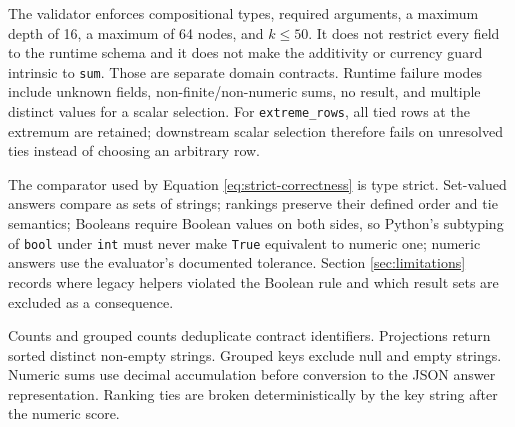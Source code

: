 The validator enforces compositional types, required arguments, a maximum depth of 16, a maximum
of 64 nodes, and $k\leq50$.  It does not restrict every field to the runtime schema and it does
not make the additivity or currency guard intrinsic to \texttt{sum}.  Those are separate domain
contracts.  Runtime failure modes include unknown fields, non-finite/non-numeric sums, no result,
and multiple distinct values for a scalar selection.  For \texttt{extreme\_rows}, all tied rows
at the extremum are retained; downstream scalar selection therefore fails on unresolved ties
instead of choosing an arbitrary row.

The comparator used by Equation \ref{eq:strict-correctness} is type strict.  Set-valued answers
compare as sets of strings; rankings preserve their defined order and tie semantics; Booleans
require Boolean values on both sides, so Python's subtyping of \texttt{bool} under \texttt{int}
must never make \texttt{True} equivalent to numeric one; numeric answers use the evaluator's
documented tolerance.  Section \ref{sec:limitations} records where legacy helpers violated the
Boolean rule and which result sets are excluded as a consequence.

Counts and grouped counts deduplicate contract identifiers.  Projections return sorted distinct
non-empty strings.  Grouped keys exclude null and empty strings.  Numeric sums use decimal
accumulation before conversion to the JSON answer representation.  Ranking ties are broken
deterministically by the key string after the numeric score.
